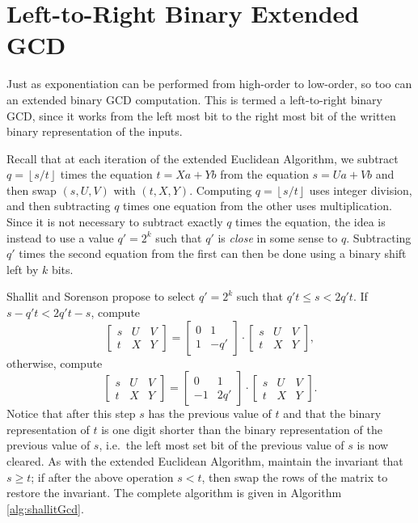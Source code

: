 \documentclass{ucalgthes1}
\theoremstyle{definition}
\newcommand{\matrixtt}[4]{\left[ \begin{array}{rr} #1 & #2 \\ #3 & #4 \end{array} \right]}
\newcommand{\matrixThreeTwo}[6]{\left[ \begin{array}{rrr} #1 & #2 & #3 \\ #4 & #5 & #6 \end{array} \right]}
\newcommand{\floor}[1]{\left\lfloor #1 \right\rfloor}
\begin{document}
\section{Left-to-Right Binary Extended GCD}
\label{sec:gcdL2R}


Just as exponentiation can be performed from high-order to low-order, so too can an extended binary GCD computation.  This is termed a left-to-right binary GCD, since it works from the left most bit to the right most bit of the written binary representation of the inputs.

Recall that at each iteration of the extended Euclidean Algorithm, we subtract $q = \floor{s/t}$ times the equation $t = Xa + Yb$ from the equation $s = Ua + Vb$ and then swap $(s, U, V)$ with $(t, X, Y)$.  Computing $q=\floor{s/t}$ uses integer division, and then subtracting $q$ times one equation from the other uses multiplication.  Since it is not necessary to subtract exactly $q$ times the equation, the idea is instead to use a value $q' = 2^k$ such that $q'$ is \emph{close} in some sense to $q$.  Subtracting $q'$ times the second equation from the first can then be done using a binary shift left by $k$ bits.

Shallit and Sorenson \cite{Shallit1994} propose to select $q'=2^k$ such that $q't \le s < 2q't$.  If $s - q't < 2q't - s$, compute
\[
	\matrixThreeTwo{s}{U}{V}{t}{X}{Y} =
		\matrixtt{0}{1}{1}{-q'} \cdot \matrixThreeTwo{s}{U}{V}{t}{X}{Y},
\]
otherwise, compute
\[
	\matrixThreeTwo{s}{U}{V}{t}{X}{Y} =
		\matrixtt{0}{1}{-1}{2q'} \cdot \matrixThreeTwo{s}{U}{V}{t}{X}{Y}.
\]
Notice that after this step $s$ has the previous value of $t$ and that the binary representation of $t$ is one digit shorter than the binary representation of the previous value of $s$, i.e.\ the left most set bit of the previous value of $s$ is now cleared.  As with the extended Euclidean Algorithm, maintain the invariant that $s \ge t$; if after the above operation $s < t$, then swap the rows of the matrix to restore the invariant. The complete algorithm is given in Algorithm \ref{alg:shallitGcd}.
\end{document}

